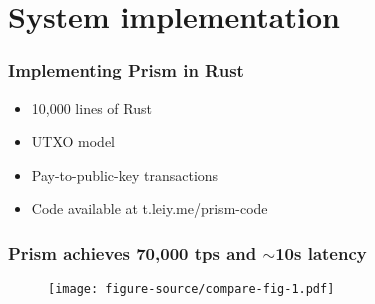 \documentclass[svgnames]{beamer}
\begin{document}
\section{System implementation}

\begin{frame}
\end{frame}

\begin{frame}
    \frametitle{Implementing Prism in Rust}
    \begin{itemize}
        \item 10,000 lines of Rust
        \item UTXO model
        \item Pay-to-public-key transactions
        \item Code available at t.leiy.me/prism-code
    \end{itemize}
\end{frame}

\begin{frame}
    \frametitle{Prism achieves 70,000 tps and $\sim$10s latency}
    \begin{figure}
        \centering
        \texttt{[image: figure-source/compare-fig-1.pdf]}
    \end{figure}
\end{frame}
\end{document}
